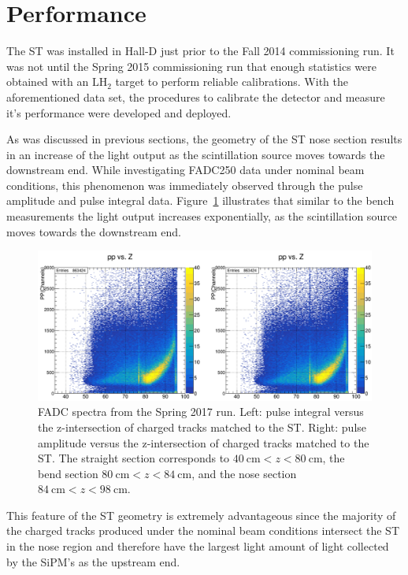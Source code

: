 \section{Performance} \label{sec:perform}

The ST was installed in Hall-D just prior to the Fall 2014 \gx{} commissioning run.  It was not until the Spring 2015 commissioning run that enough statistics were obtained with an $\mathrm{LH_{2}}$ target to perform reliable calibrations.  With the aforementioned data set, the procedures to calibrate the detector and measure it's performance were developed and deployed.

As was discussed in previous sections, the geometry of the ST nose section results in an increase of the light output as the scintillation source moves towards the downstream end.  While investigating FADC250 data under nominal beam conditions, this phenomenon was immediately observed through the pulse amplitude and pulse integral data. Figure~\ref{fig:pippvszint} illustrates that similar to the bench measurements the light output increases exponentially, as the scintillation source moves towards the downstream end.
	\begin{figure}[!htb]
		\centering
		\includegraphics[width=1.0\columnwidth]{performance/figs/pi_pp_vs_zint}
		\caption{FADC spectra from the Spring 2017 run. Left: pulse integral versus the z-intersection of charged tracks matched to the ST. Right: pulse amplitude versus the z-intersection of charged tracks matched to the ST. The straight section corresponds to $40\ \mathrm{cm} < z < 80\ \mathrm{cm}$, the bend section $80\ \mathrm{cm} < z < 84\ \mathrm{cm}$, and the nose section $84\ \mathrm{cm} < z < 98\ \mathrm{cm}$.}
		\label{fig:pippvszint}
	\end{figure}
This feature of the ST geometry is extremely advantageous since the majority of the charged tracks produced under the nominal \gx{} beam conditions intersect the ST in the nose region and therefore have the largest light amount of light collected by the SiPM's as the upstream end.

